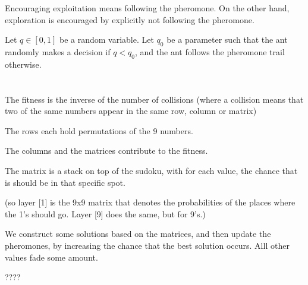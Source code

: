 \documentclass[11pt]{article}
\begin{document}
Encouraging exploitation means following the pheromone. On the other hand, exploration is encouraged by explicitly not following the pheromone. 

Let $q \in [0,1]$ be a random variable. Let $q_0$ be a parameter such that the ant randomly makes a decision if $q < q_0$, and the ant follows the pheromone trail otherwise.



\section{}

The fitness is the inverse of the number of collisions (where a collision means that two of the same numbers appear in the same row, column or matrix)

The rows each hold permutations of the 9 numbers. 

The columns and the matrices contribute to the fitness.

The matrix is a stack on top of the sudoku, with for each value, the chance that is should be in that specific spot.

(so layer [1] is the 9x9 matrix that denotes the probabilities of the places where the 1's should go. Layer [9] does the same, but for 9's.)

We construct some solutions based on the matrices, and then update the pheromones, by increasing the chance that the best solution occurs. Alll other values fade some amount.

????
\end{document}
